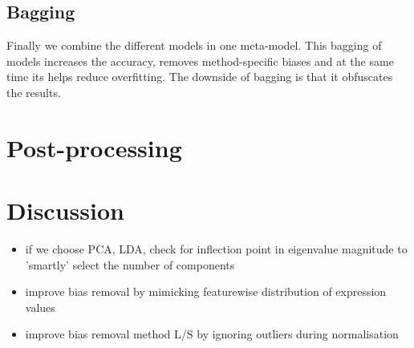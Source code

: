 \documentclass[a4paper,10pt]{article}
\begin{document}
\subsection{Bagging}
%
Finally we combine the different models in one meta-model. 
This bagging of models increases the accuracy, removes method-specific biases and at the same time its helps reduce overfitting.
The downside of bagging is that it obfuscates the results.

\section{Post-processing}
%


\section{Discussion}

\begin{itemize}
\item if we choose PCA, LDA, check for inflection point in eigenvalue magnitude to 'smartly' select the number of components
\item improve bias removal by mimicking featurewise distribution of expression values
\item improve bias removal method L/S by ignoring outliers during normalisation
\end{itemize}



\end{document}
